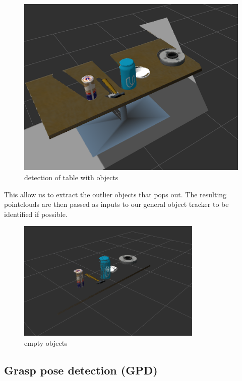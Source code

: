 \documentclass[runningheads,a4paper]{llncs}
\begin{document}
\begin{figure}
  \centering
  \includegraphics[width=400pt]{images/grasp.png}
  \caption{detection of table with objects }
\end{figure} 

This allow us to extract the outlier objects that pops out. The resulting pointclouds are then passed as inputs to our general object tracker to be identified if possible.

\begin{figure}
  \centering
  \includegraphics[width=250pt]{images/grasp2.png}
  \caption{empty objects}
\end{figure}

\newpage
\subsection{Grasp pose detection (GPD)}
\end{document}
